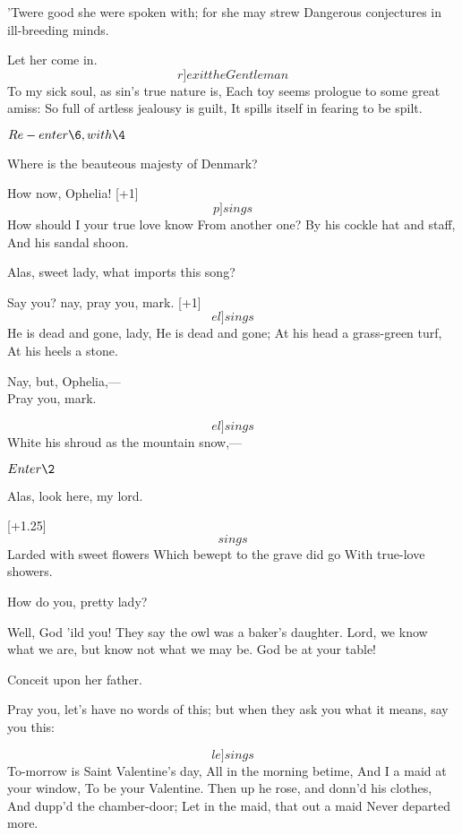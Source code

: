 \documentclass[11pt]{book}
\newenvironment {song}[1][0]
 {\Versus 
  \Locus \textus {+7em+#1em} 
  \Forma \strophae {01}
 }
 {\endVersus}
\begin{document}
\6	'Twere good she were spoken with; for she may strew
	Dangerous conjectures in ill-breeding minds.

\3	Let her come in. 	\[r]exit the Gentleman\]
	To my sick soul, as sin's true nature is,
	Each toy seems prologue to some great amiss:
	So full of artless jealousy is guilt,
	It spills itself in fearing to be spilt.

	\(Re-enter \6, with \4\)

\4	Where is the beauteous majesty of Denmark?

\3	How now, Ophelia!
\begin{song} [+1]
\4	\[p]sings\] How should I your true love know  
	From another one?
	By his cockle hat and staff,
	And his sandal shoon.
\end{song}

\3	Alas, sweet lady, what imports this song?

\4	Say you? nay, pray you, mark.
\begin{song} [+1]
\[el]sings\] He is dead and gone, lady,   
   He is dead and gone;
	At his head a grass-green turf,
	At his heels a stone.
\end{song}

\3	Nay, but, Ophelia,--- \\

\4	Pray you, mark.
\begin{song}[-2]
	\[el]sings\] White his shroud as the mountain snow,---
\end{song}

	\(Enter \2\)

\3	Alas, look here, my lord.

\begin{song} [+1.25]
\4	\[sings\] Larded with sweet flowers
	Which bewept to the grave did go
	With true-love showers.
\end{song}

\Prosa              

\2	How do you, pretty lady?

\4	Well, God 'ild you! They say the owl was a baker's
	daughter. Lord, we know what we are, but know not
	what we may be. God be at your table!

\2	Conceit upon her father.

\4	Pray you, let's have no words of this; but when they
	ask you what it means, say you this:

\begin{song}[-2]
	\[le]sings\] To-morrow is Saint Valentine's day,
	All in the morning betime,
	And I a maid at your window,
	To be your Valentine.
	Then up he rose, and donn'd his clothes,
	And dupp'd the chamber-door;
	Let in the maid, that out a maid
	Never departed more.
\end{song}
\end{document}
